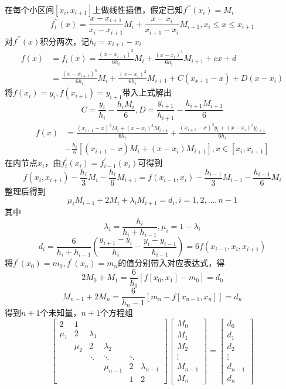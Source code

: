 \documentclass[12pt,a4paper,UTF8]{ctexart}
\begin{document}
\begin{enumerate}
	在每个小区间$[x_i,x_{i+1}]$上做线性插值，假定已知$f^{\prime \prime}(x_i)=M_i$
	$$
		f^{\prime \prime}_i (x)=\frac{x-x_{i+1}}{x_i-x_{i+1}} M_i+\frac{x-x_{i}}{x_{i+1}-x_{i}} M_{i+1},x_i\leq x\leq x_{i+1}
	$$
	对$f^{\prime \prime}(x)$积分两次，记$h_i=x_{i+1}-x_i$
	$$
	\begin{aligned}
		f(x) &=  f_i(x) = \frac{(x-x_{i+1})^3}{6h_i}M_i+\frac{(x-x_i)^3}{6h_i}M_{i+1}+cx+d\\
			&=\frac{(x-x_{i+1})^3}{6h_i}M_i+\frac{(x-x_i)^3}{6h_i}M_{i+1}+C(x_{x+1}-x)+D(x-x_i)
	\end{aligned}
	$$
	将$f (x_i)=y_i,f (x_{i+1})=y_{i+1}$带入上式解出
	$$
		C=\frac {y_i} {h_i} - \frac {h_i M_i} {6}, D=\frac {y_{i+1} }{h_{i+1}} - \frac {h_{i+1} M_{i+1}} {6}
	$$
	$$
	\begin{aligned}
		f(x) &= \frac{(x_{i+1}-x)^3 M_i+(x-x_i)^3 M_{i+1}}{6h_i}+\frac{(x_{i+1}-x)^3 y_i+(x-x_i)^3 y_{i+1}}{6h_i}\\
		&- \frac{h_i}{6} [(x_{i+1}-x)M_i+(x-x_i)M_{i+1}],x\in [x_i,x_{i+1}]
	\end{aligned}
	$$
	在内节点$x_i$，由$f^\prime_i(x_i)=f^\prime_{i-1}(x_i)$可得到
	$$
		f(x_i,x_{i+1})-\frac{h_i}{3}M_i-\frac{h_i}{6}M_{i+1}=f(x_{i-1},x_{i})-\frac{h_{i-1}}{3}M_{i-1}-\frac{h_{i-1}}{6}M_{i}
	$$
	整理后得到
	$$
		\mu_i M_{i-1} +2M_i+\lambda_i M_{i+1} =d_i, i=1,2,\dots,n-1
	$$
	其中
	$$
		\lambda_i = \frac{h_i}{h_i+h_{i-1}},\mu_i = 1-\lambda_i
	$$
	$$
		d_i = \frac{6}{h_i+h_{i-1}}(\frac{y_{i+1}-y_i}{h_i}-\frac{y_i-y_{i-1}}{h_{i-1}})=6f(x_{i-1},x_i,x_{i+1})
	$$
	将$f^\prime(x_0)=m_0,f^\prime(x_n)=m_n$的值分别带入对应表达式，得
	$$
		2M_0+M_1=\frac{6}{h_0}[f[x_0,x_1]-m_0]=d_0
	$$
	$$
		M_{n-1}+2M_n=\frac{6}{h_n-1}[m_n-f[x_{n-1},x_n]]=d_n
	$$
	得到$n+1$个未知量，$n+1$个方程组
	$$
		\left[\begin{array}{llllll}
			2   & 1 &        &        &    &    \\
	        \mu_1  & 2  & \lambda_1     &        &    &    \\
           		& \mu_2 & 2      & \lambda_2 &    &    \\
            	&    & \ddots & \ddots & \ddots &    \\
            	&    &        & \mu_{n-1}     & 2  & \lambda_{n-1} \\
            	&    &        &        & 1 & 2
		\end{array}\right]
		\left[\begin{array}{l}
			M_0\\
			M_1\\
			M_2\\
			\vdots \\
			M_{n-1} \\
			M_n
		\end{array}\right]=
		\left[\begin{array}{l}
			d_0\\
			d_1\\
			d_2\\
			\vdots \\
			d_{n-1} \\
			d_n
		\end{array}\right]
	$$



\end{enumerate}
\end{document}
